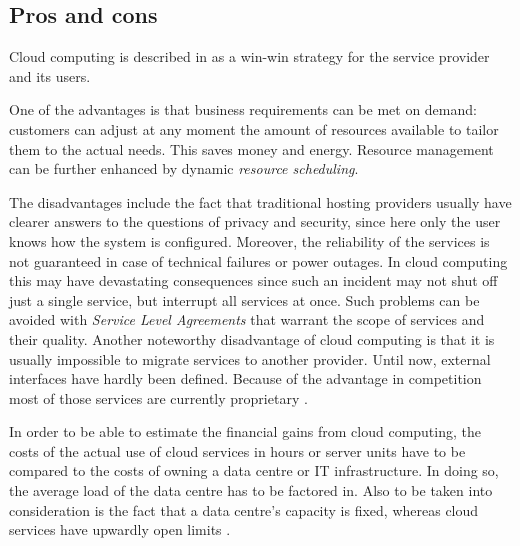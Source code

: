 \subsection{Pros and cons}

Cloud computing is described in  as a win-win strategy for the service provider and its users.

One of the advantages is that business requirements can be met on demand: customers can adjust at any moment the amount of resources available to tailor them to the actual needs. This saves money and energy. Resource management can be further enhanced by dynamic \textit{resource scheduling}.

The disadvantages include the fact that traditional hosting providers usually have clearer answers to the questions of privacy and security, since here only the user knows how the system is configured. Moreover, the reliability of the services is not guaranteed in case of technical failures or power outages. In cloud computing this may have devastating consequences since such an incident may not shut off just a single service, but interrupt all services at once. Such problems can be avoided with \textit{Service Level Agreements} that warrant the scope of services and their quality. Another noteworthy disadvantage of cloud computing is that it is usually impossible to migrate services to another provider. Until now, external interfaces have hardly been defined. Because of the advantage in competition most of those services are currently proprietary .

In order to be able to estimate the financial gains from cloud computing, the costs of the actual use of cloud services in hours or server units have to be compared to the costs of owning a data centre or IT infrastructure. In doing so, the average load of the data centre has to be factored in. Also to be taken into consideration is the fact that a data centre's capacity is fixed, whereas cloud services have upwardly open limits .